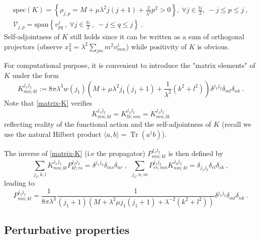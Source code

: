 \documentclass[a4paper,11pt,twoside]{article}
\numberwithin{equation}{section}
\DeclareMathOperator{\tr}{Tr}
\theoremstyle{nonumberplain}
\newcounter{and}
\begin{document}
%
\begin{eqnarray}
&\text{spec}(K) = \left\{ \rho_{j,p} = M + \mu \lambda^2 j(j+1) + \frac{2}{\lambda^2} p^2>0 \right\},\ \forall j \in \frac{\mathbb{N}}{2} , \ -j \le p \le j \ , \label{spec-K}& \\[2pt]
&\mathcal{V}_{j,p} = \text{span}\left\{v^j_{pq} \ , \ \forall j \in \frac{\mathbb{N}}{2} \ , \ -j \le q \le j \right\} \ . \label{eigensp-K}&
\end{eqnarray}
%
Self-adjointness of $K$ still holds since it can be written as a sum of orthogonal projectors (observe $x_3^2 = \lambda^2 \sum_{jm} m^2 v^j_{mm}$) while positivity of $K$ is obvious.\par%
%
For computational purpose, it is convenient to introduce the "matrix elements" of $K$ under the form%
%
\begin{equation}
K^{j_1 j_2}_{mn;kl} := 8\pi\lambda^3 w(j_1) \left( M + \mu \lambda^2 j_1 (j_1+1) + \frac{1}{\lambda^2} (k^2+l^2) \right) \delta^{j_1j_2} \delta_{ml} \delta_{nk} \ . \label{matrix-K} 
\end{equation}
%
Note that \eqref{matrix-K} verifies%
%
\begin{equation}
K^{j_1j_2}_{mn;kl} = K^{j_1j_2}_{lk;nm} = K^{j_1j_2}_{mn;lk} \label{sym-K}
\end{equation}
%
reflecting reality of the functional action and the self-adjointness of $K$ (recall we use the natural Hilbert product $\langle a,b \rangle = \tr(a^\dag b)$).\par%
%
The inverse of \eqref{matrix-K} (i.e the propagator) $P^{j_1j_2}_{mn;kl}$ is then defined by%
%
\begin{equation}
\sum_{j_2,k,l} K^{j_1j_2}_{mn;lk} P^{j_2j_3}_{kl;rs} = \delta^{j_1j_3} \delta_{ms} \delta_{nr} \ , \ \ \sum_{j_2,n,m} P^{j_1j_2}_{rs;mn} K^{j_2j_3}_{nm;kl} = \delta_{j_1j_3} \delta_{rl} \delta_{sk} \ , \label{propagator-def}
\end{equation}
%
leading to%
%
\begin{equation}
P^{j_1j_2}_{mn;kl} = \frac{1}{8\pi\lambda^3} \frac{1}{(j_1+1)\left(M+\lambda^2\mu j_1(j_1+1)+\lambda^{-2}(k^2+l^2)\right)}\delta^{j_1j_2}\delta_{ml}\delta_{nk} \ .  \label{propagator}
\end{equation}

\subsection{Perturbative properties}\label{subsection32}
\end{document}
